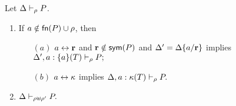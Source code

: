 \begin{lemma}[Weakening]\label{lemm:Weakening_Lemma}
Let $ \Delta\vdash_\rho P$.
\begin{enumerate}
\item  If $a\notin\mathsf{fn}(P)\cup\rho$, then
\begin{itemize}
\item [$(a)$] $a \leftrightarrow {\mathbf{r}}$ and ${\mathbf{r}}\notin\mathsf{sym}(P)$ and $\Delta'=\Delta\{a/{\mathbf{r}}\}$ implies $ \Delta', a: \{a\}(T) \vdash_\rho P;$
\item [$(b)$] $a \leftrightarrow {\mathbf{\kappa}}$ implies $ \Delta, a: {\mathbf{\kappa}}(T) \vdash_\rho P.$
\end{itemize}
\item  $ \Delta\vdash_{\rho\uplus\rho'} P.$
\end{enumerate}
\end{lemma}

